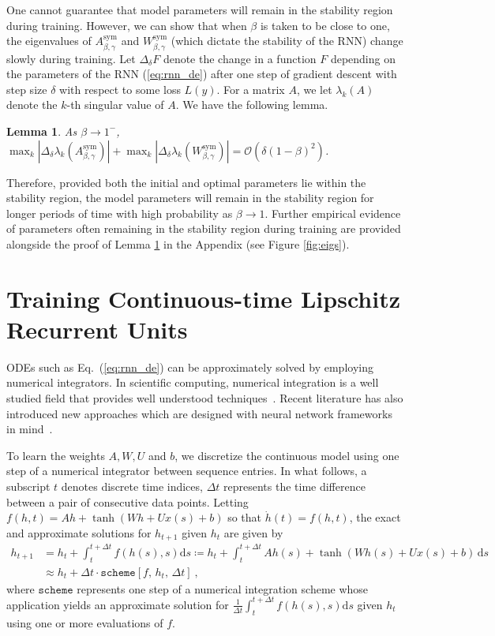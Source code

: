 \documentclass{article} \usepackage{iclr2021_conference,times}
\newtheorem{lemma}{Lemma}
\newcommand{\sym}{\mathrm{sym}}
\begin{document}
One cannot guarantee that model parameters will remain in the stability region during training. However, we can show that when $\beta$ is taken to be close to one, the eigenvalues of $A_{\beta,\gamma}^\sym$ and $W_{\beta,\gamma}^\sym$ (which dictate the stability of the RNN) change slowly during training. Let $\Delta_\delta F$ denote the change in a function $F$ depending on the parameters of the RNN (\ref{eq:rnn_de}) after one step of gradient descent with step size $\delta$ with respect to some loss $L(y)$. For a matrix $A$, we let $\lambda_k(A)$ denote the $k$-th singular value of $A$. We have the following lemma.
\begin{lemma}
\label{lem:Training}
As $\beta \to 1^-$, $\max_k |\Delta_\delta \lambda_k(A_{\beta,\gamma}^{\sym})| + \max_k |\Delta_\delta \lambda_k(W_{\beta,\gamma}^{\sym})| = \mathcal{O}(\delta(1-\beta)^2)$.
\end{lemma}
Therefore, provided both the initial and optimal parameters lie within the stability region, the model parameters will remain in the stability region for longer periods of time with high probability as $\beta \to 1$. Further empirical evidence of parameters often remaining in the stability region during training are provided alongside the proof of Lemma \ref{lem:Training} in the Appendix (see Figure \ref{fig:eigs}).

\section{Training Continuous-time Lipschitz Recurrent Units}
\label{sxn:lipshitz_recurrent_unit}

ODEs such as Eq.~(\ref{eq:rnn_de}) can be approximately solved by employing numerical integrators. In scientific computing, numerical integration is a well studied field that provides well understood techniques~\citep{LeVeque}. Recent literature has also introduced new approaches which are designed with neural network frameworks in mind~\citep{chen2018neural}. 

To learn the weights $A, W, U$ and $b$, we discretize the continuous model using one step of a numerical integrator between sequence entries. 
In what follows, a subscript $t$ denotes discrete time indices, $\Delta t$ represents the time difference between a pair of consecutive data points. Letting $f(h, t) = A h + \tanh(W h + U x(s) + b)$ so that $\dot{h}(t) = f(h,t)$, the exact and approximate solutions for $h_{t+1}$ given $h_t$ are given by
\begin{align}
	h_{t+1} &= h_t + \int_t^{t+\Delta t} f(h(s), s) \mathrm{d} s \coloneqq h_t + \int_t^{t+\Delta t} Ah(s) + \tanh(Wh(s) + Ux(s) + b)\,\mathrm{d}s \\
&\approx h_t + \Delta t \cdot \mathtt{scheme} \left[f,\, h_t,\, \Delta t\right] \ ,
\end{align}
where $\mathtt{scheme}$ represents one step of a numerical integration scheme whose application yields an approximate solution for $\frac{1}{\Delta t} \int_t^{t+\Delta t} f(h(s), s) \mathrm{d} s$ given $h_t$ using one or more evaluations of $f$.
\end{document}
